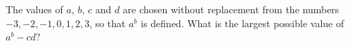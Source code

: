 The values of $a$, $b$, $c$ and $d$ are chosen without replacement from the numbers $-3,-2,-1,0,1,2,3$, so that $a^b$ is defined. What is the largest possible value of $a^b-cd$?
